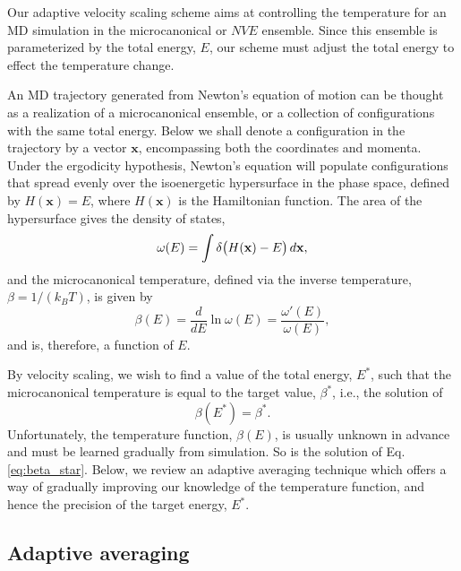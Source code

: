 \documentclass[reprint]{revtex4-1}
\begin{document}
Our adaptive velocity scaling scheme aims at
controlling the temperature for an
MD simulation in the microcanonical or $NVE$ ensemble.
%
Since this ensemble is parameterized by
the total energy, $E$,
our scheme must adjust the total energy
to effect the temperature change.

An MD trajectory generated from
Newton's equation of motion
can be thought as a realization
of a microcanonical ensemble,
or a collection of configurations
with the same total energy.
%
Below we shall denote a configuration in the trajectory
by a vector $\mathbf x$,
encompassing both the coordinates and momenta.
%
Under the ergodicity hypothesis,
Newton's equation will populate configurations
that spread evenly over
the isoenergetic hypersurface in the phase space,
defined by
$H(\mathbf x) = E$,
where $H(\mathbf x)$ is the Hamiltonian function.
%
The area of the hypersurface gives the density of states,
%
\begin{equation}
  \omega(E)
  =
  \int
    \delta\bigl( H(\mathbf x) - E \bigr)
    \, d\mathbf x
  ,
  \notag
\end{equation}
%
and the microcanonical temperature,
defined via the inverse temperature,
$\beta = 1/(k_B T)$,
is given by
%
\begin{equation}
  \beta(E)
  =
  \frac{ d }{ dE }
  \ln \omega(E)
  =
  \frac{ \omega'(E) }
       { \omega(E)  }
  ,
  \label{eq:betaE_def}
\end{equation}
%
and is, therefore, a function of $E$.
%

By velocity scaling, we wish to
find a value of the total energy, $E^*$,
such that the microcanonical temperature
is equal to the target value, $\beta^*$,
i.e., the solution of
%
\begin{equation}
  \beta(E^*)
  =
  \beta^*
  .
  \label{eq:beta_star}
\end{equation}
%
Unfortunately, the temperature function, $\beta(E)$,
is usually unknown in advance
and must be learned gradually from simulation.
%
So is the solution of Eq. \eqref{eq:beta_star}.
%
Below, we review an adaptive averaging technique
which offers a way of gradually improving
our knowledge of the temperature function,
and hence the precision of the target energy, $E^*$.



\subsection{Adaptive averaging}
\end{document}
